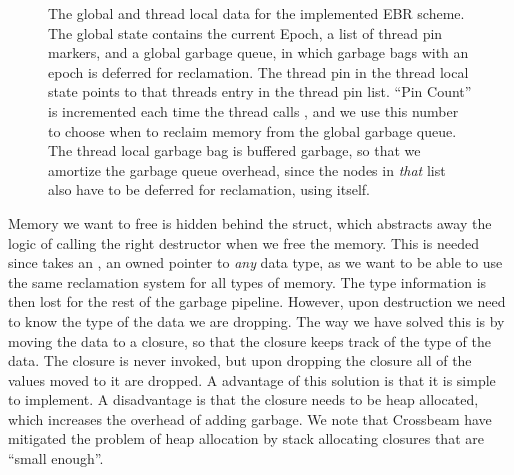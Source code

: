 \documentclass[b5paper]{report}
\begin{document}
\begin{figure}[hb]
  \caption{The global and thread local data for the implemented EBR scheme. The
    global state contains the current Epoch, a list of thread pin markers, and a
    global garbage queue, in which garbage bags with an epoch is deferred for
    reclamation.  The thread pin in the thread local state points to that
    threads entry in the thread pin list. ``Pin Count'' is incremented each time
    the thread calls , and we use this number to choose when to
    reclaim memory from the global garbage queue. The thread local garbage bag
    is buffered garbage, so that we amortize the garbage queue overhead, since
    the nodes in \emph{that} list also have to be deferred for reclamation,
    using itself.\label{fig:ebr-impl}}
\end{figure}

Memory we want to free is hidden behind the  struct, which
abstracts away the logic of calling the right destructor when we free the
memory. This is needed since  takes an
, an owned pointer to \emph{any} data type, as we want to be able
to use the same reclamation system for all types of memory. The type information
is then lost for the rest of the garbage pipeline. However, upon destruction we
need to know the type of the data we are dropping. The way we have solved this
is by moving the data to a closure, so that the closure keeps track of the type
of the data. The closure is never invoked, but upon dropping the closure all of
the values moved to it are dropped. A advantage of this solution is that it is
simple to implement. A disadvantage is that the closure needs to be heap
allocated, which increases the overhead of adding garbage. We note that
Crossbeam have mitigated the problem of heap allocation by stack allocating
closures that are ``small enough''.
\end{document}

